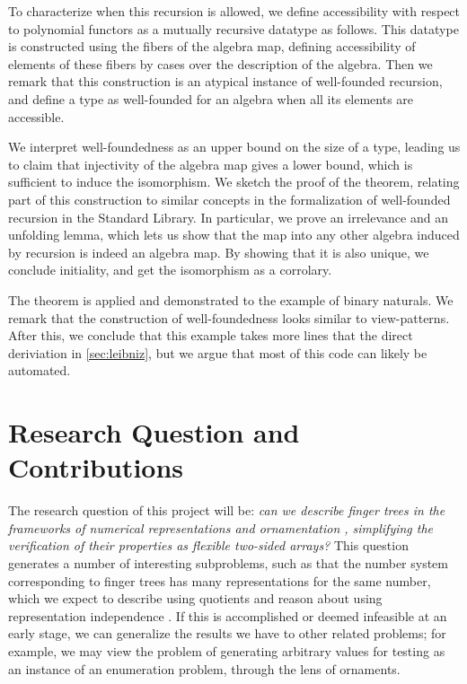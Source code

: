\documentclass{article}
\theoremstyle{plain}%
\theoremstyle{definition}
\begin{document}
To characterize when this recursion is allowed, we define accessibility with respect to polynomial functors as a mutually recursive datatype as follows. This datatype is constructed using the fibers of the algebra map, defining accessibility of elements of these fibers by cases over the description of the algebra. Then we remark that this construction is an atypical instance of well-founded recursion, and define a type as well-founded for an algebra when all its elements are accessible.

We interpret well-foundedness as an upper bound on the size of a type, leading us to claim that injectivity of the algebra map gives a lower bound, which is sufficient to induce the isomorphism. We sketch the proof of the theorem, relating part of this construction to similar concepts in the formalization of well-founded recursion in the Standard Library. In particular, we prove an irrelevance and an unfolding lemma, which lets us show that the map into any other algebra induced by recursion is indeed an algebra map. By showing that it is also unique, we conclude initiality, and get the isomorphism as a corrolary. 

The theorem is applied and demonstrated to the example of binary naturals. We remark that the construction of well-foundedness looks similar to view-patterns. After this, we conclude that this example takes more lines that the direct deriviation in \autoref{sec:leibniz}, but we argue that most of this code can likely be automated.


\section{Research Question and Contributions}\label{sec:research-question}
The research question of this project will be: \textit{can we describe finger trees \cite{fingertrees} in the frameworks of numerical representations and ornamentation \cite{progorn}, simplifying the verification of their properties as flexible two-sided arrays?} This question generates a number of interesting subproblems, such as that the number system corresponding to finger trees has many representations for the same number, which we expect to describe using quotients \cite{cuagda} and reason about using representation independence \cite{iri}. If this is accomplished or deemed infeasible at an early stage, we can generalize the results we have to other related problems; for example, we may view the problem of generating arbitrary values for testing as an instance of an enumeration problem, through the lens of ornaments.
\end{document}
